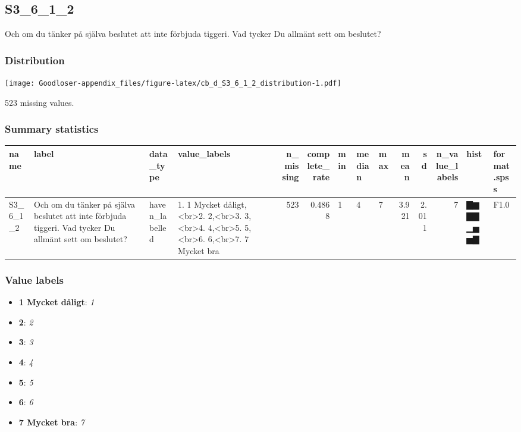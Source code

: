 \documentclass[
]{book}
\providecommand{\tightlist}{%
  \setlength{\itemsep}{0pt}\setlength{\parskip}{0pt}}
\begin{document}
\hypertarget{S3_6_1_2}{%
\subsection{S3\_6\_1\_2}\label{S3_6_1_2}}

Och om du tänker på själva beslutet att inte förbjuda tiggeri. Vad tycker Du allmänt sett om beslutet?

\hypertarget{S3_6_1_2_distribution}{%
\subsubsection{Distribution}\label{S3_6_1_2_distribution}}

\texttt{[image: Goodloser-appendix\_files/figure-latex/cb\_d\_S3\_6\_1\_2\_distribution-1.pdf]}

523 missing values.

\hypertarget{S3_6_1_2_summary}{%
\subsubsection{Summary statistics}\label{S3_6_1_2_summary}}

\begin{tabular}{l|l|l|l|r|r|l|l|l|r|r|r|l|l}
\hline
name & label & data_type & value_labels & n_missing & complete_rate & min & median & max & mean & sd & n_value_labels & hist & format.spss\\
\hline
S3_6_1_2 & Och om du tänker på själva beslutet att inte förbjuda tiggeri. Vad tycker Du allmänt sett om beslutet? & haven_labelled & 1. 1 Mycket dåligt,<br>2. 2,<br>3. 3,<br>4. 4,<br>5. 5,<br>6. 6,<br>7. 7 Mycket bra & 523 & 0.4868 & 1 & 4 & 7 & 3.921 & 2.011 & 7 & ▇▆▇▇▁▅▅▇ & F1.0\\
\hline
\end{tabular}

\hypertarget{S3_6_1_2_labels}{%
\subsubsection{Value labels}\label{S3_6_1_2_labels}}

\begin{itemize}
\tightlist
\item
  \textbf{1 Mycket dåligt}: \emph{1}
\item
  \textbf{2}: \emph{2}
\item
  \textbf{3}: \emph{3}
\item
  \textbf{4}: \emph{4}
\item
  \textbf{5}: \emph{5}
\item
  \textbf{6}: \emph{6}
\item
  \textbf{7 Mycket bra}: \emph{7}
\end{itemize}
\end{document}
